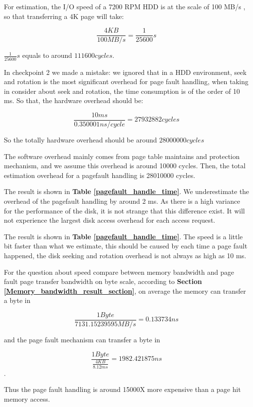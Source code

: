For estimation, the I/O speed of a 7200 RPM HDD is at the scale of 100 MB/s \cite{wiki:hdd}, so that transferring a 4K page will take:

$$ \frac{4KB}{100 MB/s} = \frac{1}{25600} s $$

$\frac{1}{25600} s$ equals to around $111600 cycles$.

In checkpoint 2 we made a mistake: we ignored that in a HDD environment, seek and rotation is the most significant overhead for page fault handling, when taking in consider about seek and rotation, the time consumption is of the order of 10 ms. So that, the hardware overhead should be:

$$\frac{10 ms}{0.350001 ns/cycle} = 27932882 cycles$$

So the totally hardware overhead should be around $28000000 cycles$

The software overhead mainly comes from page table maintains and protection mechanism, and we assume this overhead is around 10000 cycles. Then, the total estimation overhead for a pagefault handling is 28010000 cycles.

The result is shown in \textbf{Table \ref{pagefault_handle_time}}. We underestimate the overhead of the pagefault handling by around 2 ms. As there is a high variance for the performance of the disk, it is not strange that this difference exist. It will not experience the largest disk access overhead for each access request.

The result is shown in \textbf{Table \ref{pagefault_handle_time}}. The speed is a little bit faster than what we estimate, this should be caused by each time a page fault happened, the disk seeking and rotation overhead is not always as high as 10 ms.

For the question about speed compare between memory bandwidth and page fault page transfer bandwidth on byte scale, according to \textbf{Section \ref{Memory_bandwidth_result_section}}, on average the memory can transfer a byte in

$$\frac{1 Byte}{7131.15239595 MB/s} = 0.133734 ns $$

and the page fault mechanism can transfer a byte in

$$\frac{1 Byte}{\frac{4 KB}{8.12 ms}} = 1982.421875 ns $$.

Thus the page fault handling is around 15000X more expensive than a page hit memory access.
